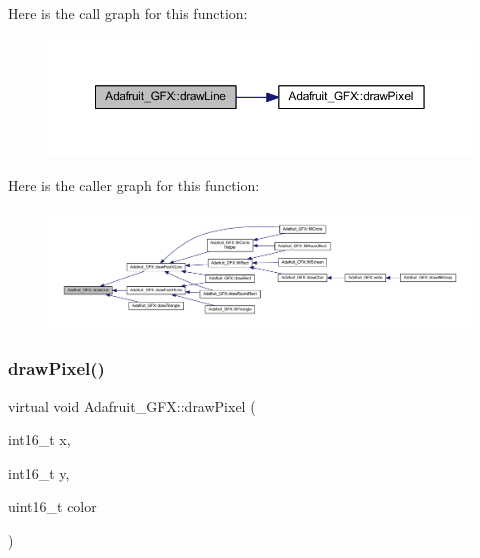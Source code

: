 Here is the call graph for this function\+:\nopagebreak
\begin{figure}[H]
\begin{center}
\leavevmode
\includegraphics[width=350pt]{class_adafruit___g_f_x_aa0ff662c2b2b48c3bac51f98c777776d_cgraph}
\end{center}
\end{figure}
Here is the caller graph for this function\+:\nopagebreak
\begin{figure}[H]
\begin{center}
\leavevmode
\includegraphics[width=350pt]{class_adafruit___g_f_x_aa0ff662c2b2b48c3bac51f98c777776d_icgraph}
\end{center}
\end{figure}
\mbox{\label{class_adafruit___g_f_x_ab7fbf72885c873266f9c7eb53b5c8896}} 
\subsubsection{\texorpdfstring{draw\+Pixel()}{drawPixel()}}
{\footnotesize\ttfamily virtual void Adafruit\+\_\+\+G\+F\+X\+::draw\+Pixel (\begin{DoxyParamCaption}\item[{int16\+\_\+t}]{x,  }\item[{int16\+\_\+t}]{y,  }\item[{uint16\+\_\+t}]{color }\end{DoxyParamCaption})\hspace{0.3cm}{\ttfamily [pure virtual]}}



